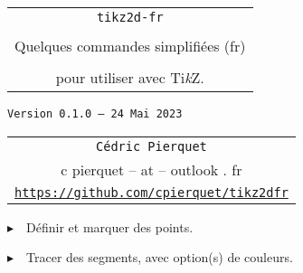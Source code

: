 \documentclass[french,a4paper,11pt]{article}
\def\TPversion{0.1.0}
\def\TPdate{24 Mai 2023}
\providecommand\tikzlogo{Ti\textit{k}Z}
\let\TikZ\tikzlogo
\begin{document}
\setlength{\aweboxleftmargin}{0.07\linewidth}
\setlength{\aweboxcontentwidth}{0.93\linewidth}
\setlength{\aweboxvskip}{8pt}

\pagestyle{fancy}

\thispagestyle{empty}

\vspace{2cm}

\begin{center}
	\begin{minipage}{0.75\linewidth}
	\begin{tcolorbox}[colframe=yellow,colback=yellow!15]
		\begin{center}
			\begin{tabular}{c}
				{\Huge \texttt{tikz2d-fr}}\\
				\\
				{\LARGE Quelques commandes simplifiées (fr)} \\
				\\
				{\LARGE pour utiliser avec \TikZ.} \\
			\end{tabular}
			
			\bigskip
			
			{\small \texttt{Version \TPversion{} -- \TPdate}}
		\end{center}
	\end{tcolorbox}
\end{minipage}
\end{center}

\begin{center}
	\begin{tabular}{c}
	\texttt{Cédric Pierquet}\\
	{\ttfamily c pierquet -- at -- outlook . fr}\\
	\texttt{\url{https://github.com/cpierquet/tikz2dfr}}
\end{tabular}
\end{center}

\vspace{0.25cm}

{$\blacktriangleright$~~Définir et marquer des points.}

\smallskip

{$\blacktriangleright$~~Tracer des segments, avec option(s) de couleurs.}

\vspace{1cm}
\end{document}
